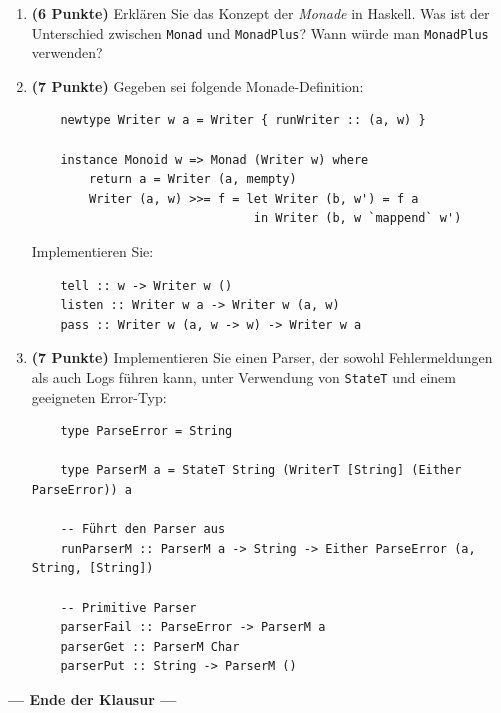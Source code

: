 \documentclass[12pt,a4paper]{article}
\begin{document}
\begin{enumerate}
    \item \textbf{(6 Punkte)} Erklären Sie das Konzept der \emph{Monade} in Haskell. Was ist der Unterschied zwischen \texttt{Monad} und \texttt{MonadPlus}? Wann würde man \texttt{MonadPlus} verwenden?
    
    \item \textbf{(7 Punkte)} Gegeben sei folgende Monade-Definition:
    \begin{verbatim}
    newtype Writer w a = Writer { runWriter :: (a, w) }
    
    instance Monoid w => Monad (Writer w) where
        return a = Writer (a, mempty)
        Writer (a, w) >>= f = let Writer (b, w') = f a
                               in Writer (b, w `mappend` w')
    \end{verbatim}
    
    Implementieren Sie:
    \begin{verbatim}
    tell :: w -> Writer w ()
    listen :: Writer w a -> Writer w (a, w)
    pass :: Writer w (a, w -> w) -> Writer w a
    \end{verbatim}
    
    \item \textbf{(7 Punkte)} Implementieren Sie einen Parser, der sowohl Fehlermeldungen als auch Logs führen kann, unter Verwendung von \texttt{StateT} und einem geeigneten Error-Typ:
    \begin{verbatim}
    type ParseError = String
    
    type ParserM a = StateT String (WriterT [String] (Either ParseError)) a
    
    -- Führt den Parser aus
    runParserM :: ParserM a -> String -> Either ParseError (a, String, [String])
    
    -- Primitive Parser
    parserFail :: ParseError -> ParserM a
    parserGet :: ParserM Char
    parserPut :: String -> ParserM ()
    \end{verbatim}
\end{enumerate}

\vfill

\begin{center}
\textbf{--- Ende der Klausur ---}
\end{center}
\end{document}
